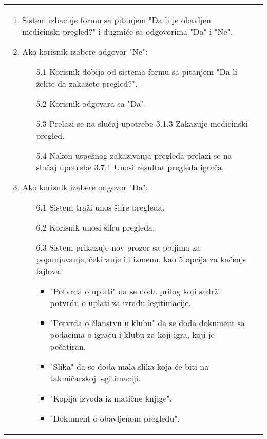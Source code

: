 \documentclass{article}
\begin{document}
\begin{longtable}{| p{} | p{} |}
\begin{enumerate}
                    \item Sistem izbacuje formu sa pitanjem "Da li je obavljen medicinski pregled?" i dugmiće sa odgovorima "Da" i "Ne".
                    \item Ako korisnik izabere odgovor "Ne":
                    \begin{enumerate}
                        \item[5.1] Korisnik dobija od sistema formu sa pitanjem "Da li želite da zakažete pregled?".
                        \item[5.2] Korisnik odgovara sa "Da".
                        \item[5.3] Prelazi se na slučaj upotrebe 3.1.3 Zakazuje medicinski pregled.
                        \item[5.4] Nakon uspešnog zakazivanja pregleda prelazi se na slučaj upotrebe 3.7.1 Unosi rezultat pregleda igrača.
                    \end{enumerate}
                    \item Ako korisnik izabere odgovor "Da":
                    \begin{enumerate}
                        \item[6.1] Sistem traži unos šifre pregleda.
                        \item[6.2] Korisnik unosi šifru pregleda.
                        \item[6.3] Sistem prikazuje nov prozor sa poljima za popunjavanje, čekiranje ili izmenu, kao 5 opcija za kačenje fajlova:
                        \begin{itemize}
                            \item "Potvrda o uplati" da se doda prilog koji sadrži potvrdu o uplati za izradu legitimacije.
                            \item "Potvrda o članstvu u klubu" da se doda dokument sa podacima o igraču i klubu za koji igra, koji je pečatiran.
                            \item "Slika" da se doda mala slika koja će biti na takmičarskoj legitimaciji.
                            \item "Kopija izvoda iz matične knjige".
                            \item "Dokument o obavljenom pregledu".
                        \end{itemize}  
                    \end{enumerate}
                 \end{enumerate}\\

\end{longtable}
\end{document}
